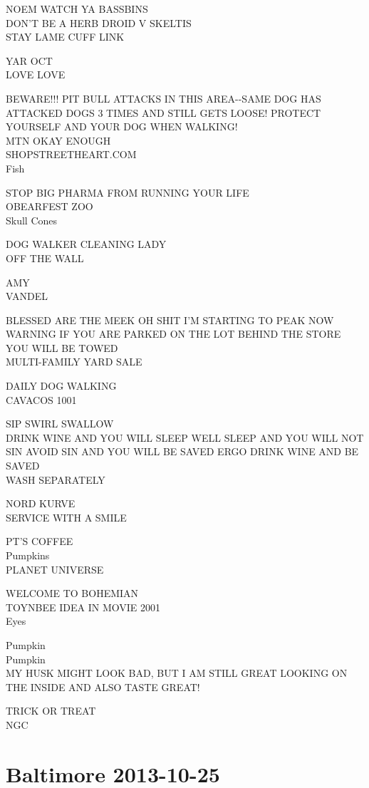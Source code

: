 \documentclass[10pt,letterpaper]{article}
\begin{document}
NOEM WATCH YA BASSBINS\\
DON'T BE A HERB DROID V SKELTIS\\
STAY LAME CUFF LINK

YAR OCT\\
LOVE LOVE

BEWARE!!! PIT BULL ATTACKS IN THIS AREA{-}{-}SAME DOG HAS ATTACKED DOGS 3 TIMES AND STILL GETS LOOSE! PROTECT YOURSELF AND YOUR DOG WHEN WALKING!\\
MTN OKAY ENOUGH\\
SHOPSTREETHEART.COM\\
Fish

STOP BIG PHARMA FROM RUNNING YOUR LIFE\\
OBEARFEST ZOO\\
Skull Cones

DOG WALKER CLEANING LADY\\
OFF THE WALL

AMY\\
VANDEL

BLESSED ARE THE MEEK OH SHIT I'M STARTING TO PEAK NOW\\
WARNING IF YOU ARE PARKED ON THE LOT BEHIND THE STORE YOU WILL BE TOWED\\
MULTI{-}FAMILY YARD SALE

DAILY DOG WALKING\\
CAVACOS 1001

SIP SWIRL SWALLOW\\
DRINK WINE AND YOU WILL SLEEP WELL SLEEP AND YOU WILL NOT SIN AVOID SIN AND YOU WILL BE SAVED ERGO DRINK WINE AND BE SAVED\\
WASH SEPARATELY

NORD KURVE\\
SERVICE WITH A SMILE

PT'S COFFEE\\
Pumpkins\\
PLANET UNIVERSE

WELCOME TO BOHEMIAN\\
TOYNBEE IDEA IN MOVIE 2001\\
Eyes

Pumpkin\\
Pumpkin\\
MY HUSK MIGHT LOOK BAD, BUT I AM STILL GREAT LOOKING ON THE INSIDE AND ALSO TASTE GREAT!

TRICK OR TREAT\\
NGC


\section*{Baltimore 2013-10-25}
\end{document}
